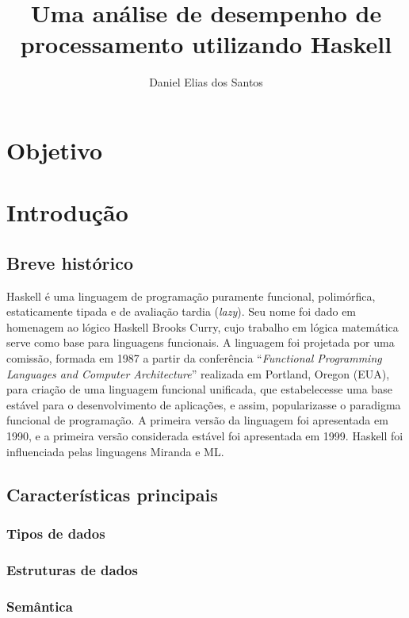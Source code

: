 \documentclass[12pt]{article}
\title{Uma análise de desempenho de processamento utilizando Haskell}
\author{Daniel Elias dos Santos\inst{1}}
\begin{document}
 
	
	\maketitle
	
	\begin{resumo} 
		
	\end{resumo}

	\section{Objetivo}
	
	\section{Introdução}
		\subsection{Breve histórico}
			Haskell é uma linguagem de programação puramente funcional, polimórfica, estaticamente tipada e de avaliação tardia (\textit{lazy})\textsuperscript{\cite{haskellWiki}}. Seu nome foi dado em homenagem ao lógico Haskell Brooks Curry, cujo trabalho em lógica matemática serve como base para linguagens funcionais. A linguagem foi projetada por uma comissão, formada em 1987 a partir da conferência ``\textit{Functional Programming Languages and Computer Architecture}'' realizada em Portland, Oregon (EUA), para criação de uma linguagem funcional unificada, que estabelecesse uma base estável para o desenvolvimento de aplicações, e assim, popularizasse o paradigma funcional de programação\textsuperscript{\cite{histHas2007}}. A primeira versão da linguagem foi apresentada em 1990, e a primeira versão considerada estável foi apresentada em 1999. Haskell foi influenciada pelas linguagens Miranda e ML.
		\subsection{Características principais}
			\subsubsection{Tipos de dados}
			\subsubsection{Estruturas de dados}
			\subsubsection{Semântica}
\end{document}
